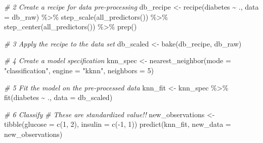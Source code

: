 \documentclass[
]{book}
\newenvironment{Shaded}{\begin{snugshade}}{\end{snugshade}}
\newcommand{\AttributeTok}[1]{\textcolor[rgb]{0.77,0.63,0.00}{#1}}
\newcommand{\CommentTok}[1]{\textcolor[rgb]{0.56,0.35,0.01}{\textit{#1}}}
\newcommand{\DecValTok}[1]{\textcolor[rgb]{0.00,0.00,0.81}{#1}}
\newcommand{\FunctionTok}[1]{\textcolor[rgb]{0.00,0.00,0.00}{#1}}
\newcommand{\NormalTok}[1]{#1}
\newcommand{\OtherTok}[1]{\textcolor[rgb]{0.56,0.35,0.01}{#1}}
\newcommand{\SpecialCharTok}[1]{\textcolor[rgb]{0.00,0.00,0.00}{#1}}
\newcommand{\StringTok}[1]{\textcolor[rgb]{0.31,0.60,0.02}{#1}}
\begin{document}
\begin{Shaded}
\begin{Highlighting}[]
\CommentTok{\# 2 Create a recipe for data pre{-}processing}
\NormalTok{db\_recipe }\OtherTok{\textless{}{-}} \FunctionTok{recipe}\NormalTok{(diabetes }\SpecialCharTok{\textasciitilde{}}\NormalTok{ ., }\AttributeTok{data =}\NormalTok{ db\_raw) }\SpecialCharTok{\%\textgreater{}\%}
  \FunctionTok{step\_scale}\NormalTok{(}\FunctionTok{all\_predictors}\NormalTok{()) }\SpecialCharTok{\%\textgreater{}\%}
  \FunctionTok{step\_center}\NormalTok{(}\FunctionTok{all\_predictors}\NormalTok{()) }\SpecialCharTok{\%\textgreater{}\%}
  \FunctionTok{prep}\NormalTok{()}
\end{Highlighting}
\end{Shaded}

\begin{Shaded}
\begin{Highlighting}[]
\CommentTok{\# 3 Apply the recipe to the data set}
\NormalTok{db\_scaled }\OtherTok{\textless{}{-}}  \FunctionTok{bake}\NormalTok{(db\_recipe, db\_raw)}
\end{Highlighting}
\end{Shaded}

\begin{Shaded}
\begin{Highlighting}[]
\CommentTok{\# 4 Create a model specification}
\NormalTok{knn\_spec }\OtherTok{\textless{}{-}} \FunctionTok{nearest\_neighbor}\NormalTok{(}\AttributeTok{mode =} \StringTok{"classification"}\NormalTok{,}
                             \AttributeTok{engine =} \StringTok{"kknn"}\NormalTok{,}
                             \AttributeTok{neighbors =} \DecValTok{5}\NormalTok{)}
\end{Highlighting}
\end{Shaded}

\begin{Shaded}
\begin{Highlighting}[]
\CommentTok{\# 5 Fit the model on the pre{-}processed data}
\NormalTok{knn\_fit }\OtherTok{\textless{}{-}}\NormalTok{ knn\_spec }\SpecialCharTok{\%\textgreater{}\%}
 \FunctionTok{fit}\NormalTok{(diabetes }\SpecialCharTok{\textasciitilde{}}\NormalTok{ ., }\AttributeTok{data =}\NormalTok{ db\_scaled)}
\end{Highlighting}
\end{Shaded}

\begin{Shaded}
\begin{Highlighting}[]
\CommentTok{\# 6 Classify}
\CommentTok{\# These are standardized value!!}
\NormalTok{new\_observations }\OtherTok{\textless{}{-}} \FunctionTok{tibble}\NormalTok{(}\AttributeTok{glucose =} \FunctionTok{c}\NormalTok{(}\DecValTok{1}\NormalTok{, }\DecValTok{2}\NormalTok{), }\AttributeTok{insulin =} \FunctionTok{c}\NormalTok{(}\SpecialCharTok{{-}}\DecValTok{1}\NormalTok{, }\DecValTok{1}\NormalTok{))}
\FunctionTok{predict}\NormalTok{(knn\_fit, }\AttributeTok{new\_data =}\NormalTok{ new\_observations)}
\end{Highlighting}
\end{Shaded}
\end{document}

